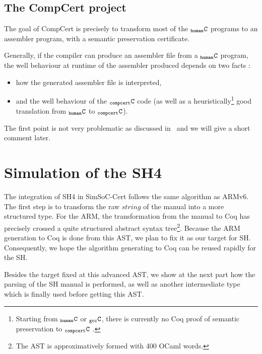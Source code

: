 \documentclass[a4paper, 11pt]{article}
\newcommand{\simgen}{{\tt simgen}\xspace}
\newcommand{\C}{$_{\tt compcert}{\tt C}$\xspace}
\newcommand{\gccC}{$_{\tt gcc}{\tt C}$\xspace}
\newcommand{\hC}{$_{\tt human}{\tt C}$\xspace}
\newcommand{\SScert}{SimSoC-Cert\xspace}
\begin{document}
\subsection{The CompCert project}
The goal of CompCert is precisely to transform most of the \hC programs to an assembler program, with a semantic preservation certificate. 

Generally, if the compiler can produce an assembler file from a \hC program, the well behaviour at runtime of the assembler produced depends on two facts :
\begin{itemize}
\item how the generated assembler file is interpreted,
\item and the well behaviour of the \C code (as well as a heuristically\footnote{Starting from \hC or \gccC, there is currently no Coq proof of semantic preservation to \C%
. } good translation from \hC to \C).
\end{itemize}
The first point is not very problematic as discussed in~\cite{Leroy-Compcert-CACM} and we will give a short comment later.

\section{Simulation of the SH4}
\label{s:simu_sh4}

The integration of SH4 in \SScert follows the same algorithm as ARMv6. The first step is to transform the raw $string$ of the manual into a more structured type. For the ARM, the transformation from the manual to Coq has precisely crossed a quite structured abstract syntax tree\footnote{The AST is approximatively formed with 400 OCaml words.}. Because the ARM generation to Coq is done from this AST, we plan to fix it as our target for SH. Consequently, we hope the algorithm generating to Coq can be reused rapidly for the SH.

\hspace{1ex}

Besides the target fixed at this advanced AST, we show at the next part how the parsing of the SH manual is performed, as well as another intermediate type which is finally used before getting this AST.
\end{document}
